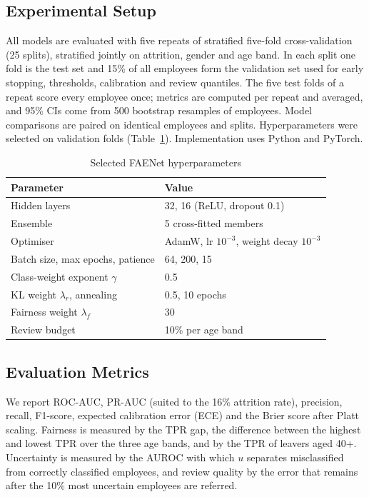 \documentclass[conference]{IEEEtran}
\begin{document}
\subsection{Experimental Setup}
All models are evaluated with five repeats of stratified five-fold cross-validation (25 splits), stratified jointly on attrition, gender and age band. In each split one fold is the test set and 15\% of all employees form the validation set used for early stopping, thresholds, calibration and review quantiles. The five test folds of a repeat score every employee once; metrics are computed per repeat and averaged, and 95\% CIs come from 500 bootstrap resamples of employees. Model comparisons are paired on identical employees and splits. Hyperparameters were selected on validation folds (Table~\ref{tab:hp}). Implementation uses Python and PyTorch.

\begin{table}[t]\centering
\caption{Selected FAENet hyperparameters}\label{tab:hp}
\scriptsize\begin{tabular}{ll}\toprule
Parameter & Value\\\midrule
Hidden layers & 32, 16 (ReLU, dropout 0.1)\\
Ensemble & 5 cross-fitted members\\
Optimiser & AdamW, lr $10^{-3}$, weight decay $10^{-3}$\\
Batch size, max epochs, patience & 64, 200, 15\\
Class-weight exponent $\gamma$ & 0.5\\
KL weight $\lambda_r$, annealing & 0.5, 10 epochs\\
Fairness weight $\lambda_f$ & 30\\
Review budget & 10\% per age band\\
\bottomrule\end{tabular}
\end{table}

\subsection{Evaluation Metrics}
We report ROC-AUC, PR-AUC (suited to the 16\% attrition rate), precision, recall, F1-score, expected calibration error (ECE) and the Brier score \cite{brier1950} after Platt scaling. Fairness is measured by the TPR gap, the difference between the highest and lowest TPR over the three age bands, and by the TPR of leavers aged 40+. Uncertainty is measured by the AUROC with which $u$ separates misclassified from correctly classified employees, and review quality by the error that remains after the 10\% most uncertain employees are referred.
\end{document}

